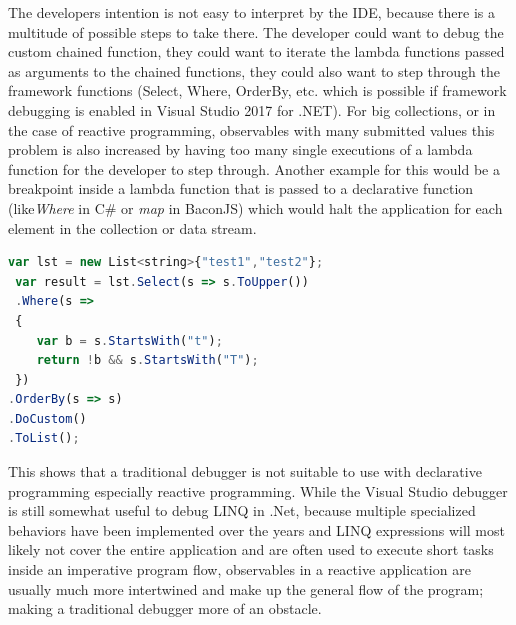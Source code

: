 The developers intention is not easy to interpret by the IDE, because there is a multitude of possible steps to take there. The developer could want to debug the custom chained function, they could want to iterate the lambda functions passed as arguments to the chained functions, they could also want to step through the framework functions (Select, Where, OrderBy, etc. which is possible if framework debugging is enabled in Visual Studio 2017 for .NET). 
For big collections, or in the case of reactive programming, observables with many submitted values this problem is also increased by having too many single executions of a lambda function for the developer to step through. Another example for this would be a breakpoint inside a lambda function that is passed to a declarative function (like\emph{Where} in C\# or \emph{map} in BaconJS) which would halt the application for each element in the collection or data stream.

\begin{lstlisting}[language=JavaScript, caption={Simple example of .NET LINQ in C\# to show the steps the Visual Studio 2017 for .NET debugger takes while debugging step-by-step.},label={lst:CSharp_LINQ}]
 var lst = new List<string>{"test1","test2"};
 var result = lst.Select(s => s.ToUpper())
 .Where(s =>
 {
	var b = s.StartsWith("t");
	return !b && s.StartsWith("T");
 })
.OrderBy(s => s)
.DoCustom()
.ToList();
\end{lstlisting}


This shows that a traditional debugger is not suitable to use with declarative programming especially reactive programming. While the Visual Studio debugger is still somewhat useful to debug LINQ in .Net, because multiple specialized behaviors have been implemented over the years and LINQ expressions will most likely not cover the entire application and are often used to execute short tasks inside an imperative program flow, observables in a reactive application are usually much more intertwined and make up the general flow of the program; making a traditional debugger more of an obstacle.


